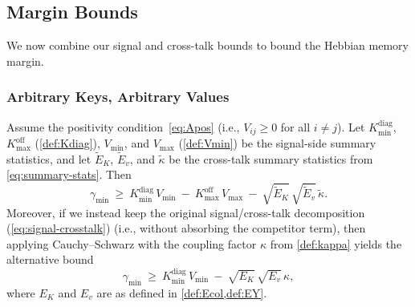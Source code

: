 \subsection{Margin Bounds}
We now combine our signal and cross-talk bounds to bound the Hebbian memory margin.
\subsubsection{Arbitrary Keys, Arbitrary Values}
\label{app:combined-deterministic}
\label{app:theory:margin_bounds:akav}
\label{app:theory:proof:arb-arb-det}
\begin{theorem}
\label{thm:combined-deterministic}
Assume the positivity condition~\eqref{eq:Apos} (i.e., \(V_{ij}\ge 0\) for all \(i\neq j\)).
Let \(K_{\min}^{\mathrm{diag}}\), \(K_{\max}^{\mathrm{off}}\) (\cref{def:Kdiag}), \(V_{\min}\), and \(V_{\max}\) (\cref{def:Vmin}) be the signal-side summary statistics, and let \(\widetilde{E}_{K}\), \(\widetilde{E}_{v}\), and \(\widetilde{\kappa}\) be the
cross-talk summary statistics from \eqref{eq:summary-stats}.
Then
\begin{equation}
\gamma_{\min}\ \ge\ K_{\min}^{\mathrm{diag}}\,V_{\min}\ -\ K_{\max}^{\mathrm{off}}\,V_{\max}\ -\ \sqrt{\widetilde{E}_K}\,\sqrt{\widetilde{E}_v}\,\widetilde{\kappa}.
\label{eq:combined-det-bound}
\end{equation}
Moreover, if we instead keep the original signal/cross-talk decomposition (\eqref{eq:signal-crosstalk})
(i.e., without absorbing the competitor term), then applying Cauchy--Schwarz with the coupling factor
$\kappa$ from \cref{def:kappa} yields the alternative bound
\begin{equation}
\gamma_{\min}\ \ge\ K_{\min}^{\mathrm{diag}}\,V_{\min}\ -\ \sqrt{E_K}\,\sqrt{E_v}\,\kappa,
\label{eq:app:akav:thm}
\end{equation}
where \(E_{K}\) and \(E_{v}\) are as defined in \cref{def:Ecol,def:EY}.

\end{theorem}
